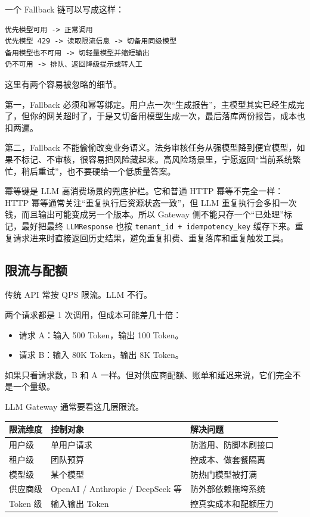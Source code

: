 \documentclass[10pt,a4paper]{ctexart}
\begin{document}
一个 Fallback 链可以写成这样：



\begin{lstlisting}
优先模型可用 -> 正常调用
优先模型 429 -> 读取限流信息 -> 切备用同级模型
备用模型也不可用 -> 切轻量模型并缩短输出
仍不可用 -> 排队、返回降级提示或转人工
\end{lstlisting}



这里有两个容易被忽略的细节。



第一，Fallback 必须和幂等绑定。用户点一次“生成报告”，主模型其实已经生成完了，但你的网关超时了，于是又切备用模型生成一次，最后落库两份报告，成本也扣两遍。



第二，Fallback 不能偷偷改变业务语义。法务审核任务从强模型降到便宜模型，如果不标记、不审核，很容易把风险藏起来。高风险场景里，宁愿返回“当前系统繁忙，稍后重试”，也不要硬给一个低质量答案。



幂等键是 LLM 高消费场景的兜底护栏。它和普通 HTTP 幂等不完全一样：HTTP 幂等通常关注“重复执行后资源状态一致”，但 LLM 重复执行会多扣一次钱，而且输出可能变成另一个版本。所以 Gateway 侧不能只存一个“已处理”标记，最好把最终 \texttt{LLMResponse} 也按 \texttt{tenant\_id + idempotency\_key} 缓存下来。重复请求进来时直接返回历史结果，避免重复扣费、重复落库和重复触发工具。



\subsection{限流与配额}


传统 API 常按 QPS 限流。LLM 不行。



两个请求都是 1 次调用，但成本可能差几十倍：


\begin{itemize}[itemsep=2pt, topsep=4pt]
  \item 请求 A：输入 500 Token，输出 100 Token。
  \item 请求 B：输入 80K Token，输出 8K Token。
\end{itemize}


如果只看请求数，B 和 A 一样。但对供应商配额、账单和延迟来说，它们完全不是一个量级。



LLM Gateway 通常要看这几层限流。


{\footnotesize
\begin{tabularx}{\textwidth}{|X|X|X|}
\hline
\textbf{限流维度} & \textbf{控制对象} & \textbf{解决问题} \\
\hline
用户级 & 单用户请求 & 防滥用、防脚本刷接口 \\
\hline
租户级 & 团队预算 & 控成本、做套餐隔离 \\
\hline
模型级 & 某个模型 & 防热门模型被打满 \\
\hline
供应商级 & OpenAI / Anthropic / DeepSeek 等 & 防外部依赖拖垮系统 \\
\hline
Token 级 & 输入输出 Token & 控真实成本和配额压力 \\
\hline
\end{tabularx}
}
\end{document}
